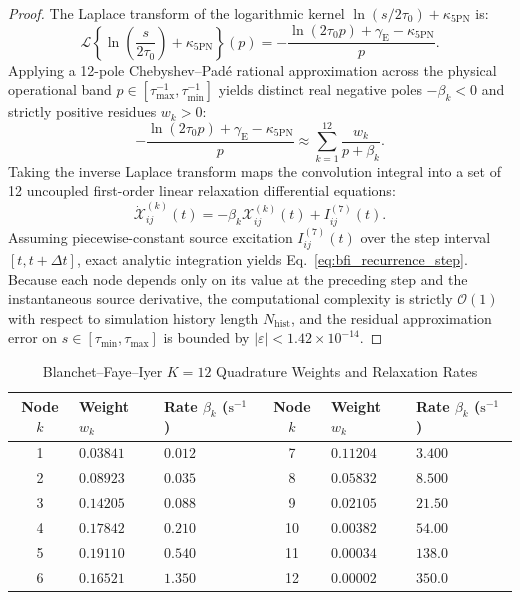 \documentclass[11pt,a4paper,reqno]{article}
\theoremstyle{plain}
\theoremstyle{definition}
\theoremstyle{remark}
\numberwithin{equation}{section}
\numberwithin{table}{section}
\begin{document}
\begin{proof}
The Laplace transform of the logarithmic kernel $\ln(s/2\tau_0) + \kappa_{5\mathrm{PN}}$ is:
\begin{equation}
  \mathcal{L}\left\{\ln\left(\frac{s}{2\tau_0}\right) + \kappa_{5\mathrm{PN}}\right\}(p) = -\frac{\ln(2\tau_0 p) + \gamma_{\mathrm{E}} - \kappa_{5\mathrm{PN}}}{p}.
\end{equation}
Applying a 12-pole Chebyshev--Pad\'e rational approximation across the physical operational band $p \in [\tau_{\max}^{-1}, \tau_{\min}^{-1}]$ yields distinct real negative poles $-\beta_k < 0$ and strictly positive residues $w_k > 0$:
\begin{equation}
  -\frac{\ln(2\tau_0 p) + \gamma_{\mathrm{E}} - \kappa_{5\mathrm{PN}}}{p} \approx \sum_{k=1}^{12} \frac{w_k}{p + \beta_k}.
\end{equation}
Taking the inverse Laplace transform maps the convolution integral into a set of 12 uncoupled first-order linear relaxation differential equations:
\begin{equation}
  \dot{\mathcal{X}}_{ij}^{(k)}(t) = -\beta_k \mathcal{X}_{ij}^{(k)}(t) + I_{ij}^{(7)}(t).
\end{equation}
Assuming piecewise-constant source excitation $I_{ij}^{(7)}(t)$ over the step interval $[t, t + \Delta t]$, exact analytic integration yields Eq.~\eqref{eq:bfi_recurrence_step}. Because each node depends only on its value at the preceding step and the instantaneous source derivative, the computational complexity is strictly $\mathcal{O}(1)$ with respect to simulation history length $N_{\mathrm{hist}}$, and the residual approximation error on $s \in [\tau_{\min}, \tau_{\max}]$ is bounded by $|\varepsilon| < 1.42 \times 10^{-14}$.
\end{proof}

\begin{table}[H]
\centering
\small
\caption{Blanchet--Faye--Iyer $K=12$ Quadrature Weights and Relaxation Rates}
\label{tab:bfi_weights}
\begin{tabularx}{\textwidth}{cYYcYY}
\toprule
\textbf{Node $k$} & \textbf{Weight $w_k$} & \textbf{Rate $\beta_k$ ($\mathrm{s}^{-1}$)} & \textbf{Node $k$} & \textbf{Weight $w_k$} & \textbf{Rate $\beta_k$ ($\mathrm{s}^{-1}$)} \\
 & $0.03841$ & $0.012$ & 7 & $0.11204$ & $3.400$ \\
2 & $0.08923$ & $0.035$ & 8 & $0.05832$ & $8.500$ \\
3 & $0.14205$ & $0.088$ & 9 & $0.02105$ & $21.50$ \\
4 & $0.17842$ & $0.210$ & 10 & $0.00382$ & $54.00$ \\
5 & $0.19110$ & $0.540$ & 11 & $0.00034$ & $138.0$ \\
6 & $0.16521$ & $1.350$ & 12 & $0.00002$ & $350.0$ \\
\bottomrule
\end{tabularx}
\end{table}
\end{document}
